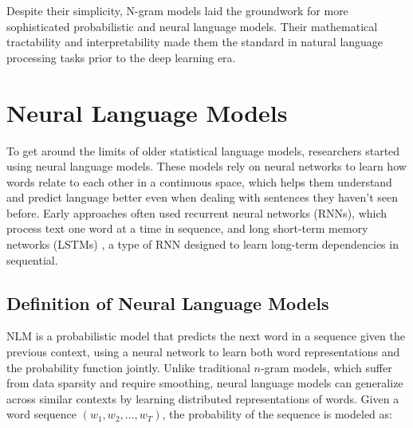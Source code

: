 Despite their simplicity, N-gram models laid the groundwork for more sophisticated probabilistic and neural language models\citep{jurafsky2000speech}. Their mathematical tractability and interpretability made them the standard in natural language processing tasks prior to the deep learning era.
	\section{Neural Language Models}
To get around the limits of older statistical language models, researchers started using neural language models. These models rely on neural networks to learn how words relate to each other in a continuous space, which helps them understand and predict language better even when dealing with sentences they haven’t seen before. Early approaches often used recurrent neural networks (RNNs), which process text one word at a time in sequence\citep{cho2014learning}, and long short-term memory networks (LSTMs) \citep{hochreiter1997long}, a type of RNN  designed to learn long-term dependencies in sequential.
\subsection{Definition of Neural Language Models}
NLM is a probabilistic model that predicts the next word in a sequence given the previous context, using a neural network to learn both word representations and the probability function jointly. Unlike traditional $n$-gram models, which suffer from data sparsity and require smoothing, neural language models can generalize across similar contexts by learning distributed representations of words. Given a word sequence $(w_1, w_2, \dots, w_T)$, the probability of the sequence is modeled as:

